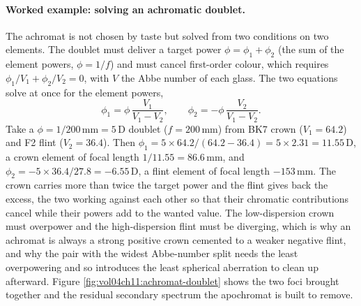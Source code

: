\paragraph{Worked example: solving an achromatic doublet.} The achromat is not
chosen by taste but solved from two conditions on two elements. The doublet must
deliver a target power $\phi = \phi_1 + \phi_2$ (the sum of the element powers,
$\phi = 1/f$) and must cancel first-order colour, which requires
$\phi_1/V_1 + \phi_2/V_2 = 0$, with $V$ the Abbe number of each glass. The two
equations solve at once for the element powers,
\[
\phi_1 = \phi\,\frac{V_1}{V_1 - V_2},
\qquad
\phi_2 = -\phi\,\frac{V_2}{V_1 - V_2} .
\]
Take a $\phi = 1/200\,\si{\milli\meter} = 5\,\text{D}$ doublet
($f = 200\,\si{\milli\meter}$) from BK7 crown ($V_1 = 64.2$) and F2 flint
($V_2 = 36.4$). Then
$\phi_1 = 5\times 64.2/(64.2 - 36.4) = 5\times 2.31 = 11.55\,\text{D}$, a crown
element of focal length $1/11.55 = 86.6\,\si{\milli\meter}$, and
$\phi_2 = -5\times 36.4/27.8 = -6.55\,\text{D}$, a flint element of focal length
$-153\,\si{\milli\meter}$. The crown carries more than twice the target power and
the flint gives back the excess, the two working against each other so that their
chromatic contributions cancel while their powers add to the wanted value. The
low-dispersion crown must overpower and the high-dispersion flint must be
diverging, which is why an achromat is always a strong positive crown cemented to
a weaker negative flint, and why the pair with the widest Abbe-number split needs
the least overpowering and so introduces the least spherical aberration to clean
up afterward. Figure \ref{fig:vol04ch11:achromat-doublet} shows the two foci
brought together and the residual secondary spectrum the apochromat is built to
remove.




